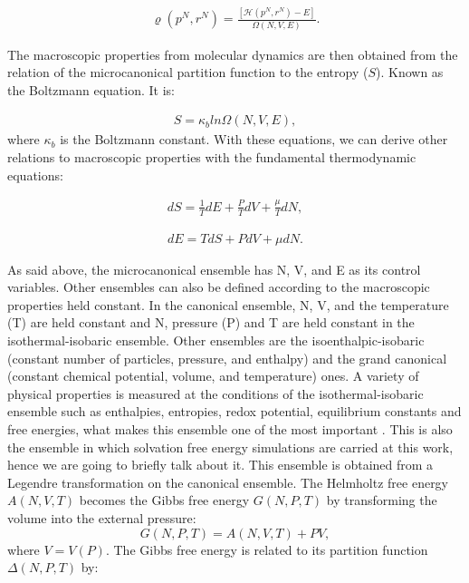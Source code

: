 \begin{equation}
\begin{aligned}
\varrho (p^{N},r^{N}) = \frac{[\mathcal{H}(p^{N},r^{N}) -E]}{ \Omega (N,V,E)} .
\end{aligned}
\end{equation}

The macroscopic properties from molecular dynamics are then obtained from the relation of the microcanonical partition function to the entropy ($S$). Known as the Boltzmann equation. It is:

\begin{equation}
\begin{aligned}
S = \kappa_{b} ln \Omega (N,V,E), 
\end{aligned}
\end{equation}
where $\kappa_{b}$ is the Boltzmann constant. With these equations, we can derive other relations to macroscopic properties with the fundamental thermodynamic equations:

\begin{equation}
\begin{aligned}
dS = \frac{1}{T} dE + \frac{P}{T} dV + \frac{\mu}{T} dN,
\end{aligned}
\end{equation}

\begin{equation}
\begin{aligned}
dE = T dS + P dV + \mu dN .
\end{aligned}
\end{equation}

As said above, the microcanonical ensemble  has  N, V, and E as its control variables. Other ensembles can also be defined according to the macroscopic properties held constant.  In the canonical ensemble,  N, V, and the temperature (T) are held constant and  N, pressure (P) and T are held constant in the isothermal-isobaric ensemble. Other ensembles are the isoenthalpic-isobaric (constant number of particles, pressure, and enthalpy) and the grand canonical (constant chemical potential, volume, and temperature) ones. A variety of physical properties is measured at the conditions of the isothermal-isobaric ensemble such as enthalpies, entropies, redox potential, equilibrium constants and free energies, what makes this ensemble one of the most important \cite{tuckerman}. This is also the ensemble in which solvation free energy simulations are carried at this work, hence we are going to briefly talk about it. This ensemble is obtained from a Legendre transformation on the canonical ensemble. The Helmholtz free energy $A(N,V,T)$ becomes the Gibbs free energy $G(N,P,T)$ by transforming the volume into the external pressure:
\begin{equation}
G(N,P,T) = A(N,V,T) + PV,
\end{equation}
where $V = V(P)$. The Gibbs free energy is related to its partition function $\Delta (N,P,T)$ by:

